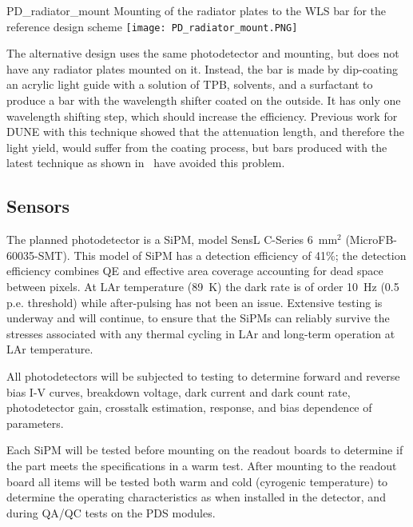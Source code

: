 \begin{cdrfigure}{PD_radiator_mount}
  {Mounting of the radiator plates to the WLS bar for the reference design scheme}
\texttt{[image: PD\_radiator\_mount.PNG]}
\end{cdrfigure}

The alternative design uses the same photodetector and mounting, but does not have
any radiator plates mounted on it.  
Instead, the bar is made by dip-coating an acrylic light guide with a solution
of TPB, solvents, and a surfactant to produce a bar with the wavelength shifter coated
on the outside.  
It has only one wavelength shifting step, which should increase the efficiency.  
Previous work for DUNE with this technique showed that the attenuation length, and
therefore the light yield, would suffer from the coating process, but bars produced with
the latest technique as shown in~\cite{conrad_jinst2015} have %
avoided this problem.




\subsection{Sensors}
The planned photodetector is a SiPM, model 
SensL C-Series 6~mm$^2$
(MicroFB-60035-SMT). %
This model of SiPM has a detection efficiency of
41\%; the detection efficiency combines QE and effective area
  coverage accounting for dead space between pixels.   At LAr temperature (89~K) the dark rate is of order 10~Hz
(0.5 p.e. threshold) while after-pulsing has not been an
issue. Extensive testing is underway and will continue, to ensure 
that the SiPMs can reliably survive the stresses associated with 
any thermal cycling in LAr and long-term operation at LAr temperature.

All photodetectors %
will be subjected to testing to determine
 forward and reverse bias I-V curves,
 breakdown voltage, dark current and dark count rate, photodetector gain, crosstalk estimation, response, and bias dependence of parameters.
 
Each SiPM will be tested before mounting on the readout boards to determine
if the part meets the specifications in a warm test.  After mounting to
the readout board all items will be tested both warm and cold (cyrogenic 
temperature) to determine the operating characteristics as when %
installed in the %
detector, and during QA/QC tests on the PDS modules.

